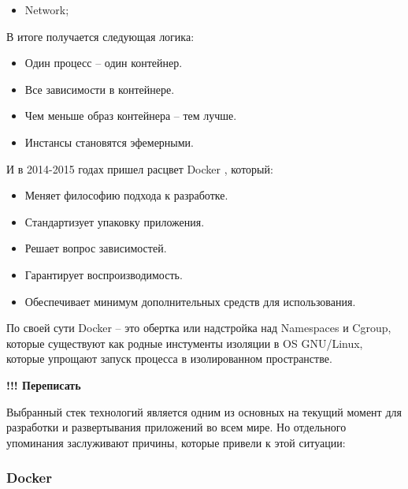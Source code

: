 \begin{enumerate}
\begin{itemize}
\begin{itemize}
                    \item Network;
                \end{itemize}
        \end{itemize}
        В итоге получается следующая логика:
        \begin{itemize}
            \item Один процесс -- один контейнер.
            \item Все зависимости в контейнере.
            \item Чем меньше образ контейнера -- тем лучше.
            \item Инстансы становятся эфемерными.
        \end{itemize}
        И в 2014-2015 годах пришел расцвет Docker \cite{демидова2019использование}, который:
        \begin{itemize}
            \item Меняет философию подхода к разработке.
            \item Стандартизует упаковку приложения.
            \item Решает вопрос зависимостей.
            \item Гарантирует воспроизводимость.
            \item Обеспечивает минимум дополнительных средств для использования.
        \end{itemize}
\end{enumerate}

По своей сути Docker -- это обертка или надстройка над Namespaces и Cgroup, которые существуют как родные инстументы изоляции в OS GNU/Linux, которые упрощают запуск процесса в изолированном пространстве.

\clearpage
\textbf{!!! Переписать}

Выбранный стек технологий является одним из основных на текущий момент для разработки и развертывания приложений во всем мире. Но отдельного упоминания заслуживают причины, которые привели к этой ситуации:

\subsubsection{Docker}

